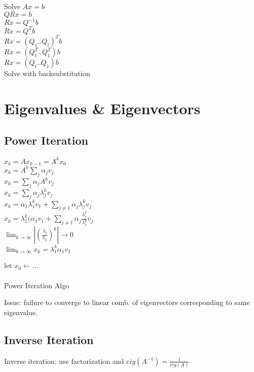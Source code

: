 \documentclass[8pt,letter]{article}
\begin{document}
\begin{multicols*}{2}
    Solve $Ax=b$\\
    $QRx = b$\\
    $Rx = Q^{-1}b$\\
    $Rx = Q^T b$\\
    $Rx = (Q_1 .. Q_t)^T b$\\    
    $Rx = (Q_t^T .. Q_1^T) b$\\
    $Rx = (Q_t .. Q_1) b$\\
    Solve with backsubstitution\\

    \vfill\null
    \pagebreak
    
    \section{Eigenvalues & Eigenvectors}

    \subsection{Power Iteration}

    $x_k = A x_{k-1} = A^k x_0$\\
    $x_k = A^k \sum_j \alpha_j v_j$\\
    $x_k = \sum_j \alpha_j A^k v_j$\\
    $x_k = \sum_j \alpha_j \lambda_j^k v_j$\\
    $x_k = \alpha_1 \lambda_1^k v_1 + \sum_{j\neq1} \alpha_j \lambda_j^k v_j$\\
    $x_k = \lambda_1^k (\alpha_1 v_1 + \sum_{j\neq1} \alpha_j \frac{\lambda_j^k}{\lambda_1^k} v_j$\\
    $\lim_{k \rightarrow \infty} |(\frac{\lambda_j}{\lambda_1})^k| \rightarrow 0$\\
    $\lim_{k \rightarrow \infty} x_k = \lambda_1^k \alpha_1 v_1$

    \begin{algorithm}[H]
      let $x_0 \leftarrow ...$\\
      \\
      \caption{Power Iteration Algo \label{Algo_power_iteration}}
    \end{algorithm}
    Issue: failure to converge to linear comb. of eigenvectors corresponding to same eigenvalue.\\

    \subsection{Inverse Iteration}
    Inverse iteration: use factorization and $eig(A^{-1}) = \frac{1}{eig(A)}$\\
    

\end{multicols*}
\end{document}
